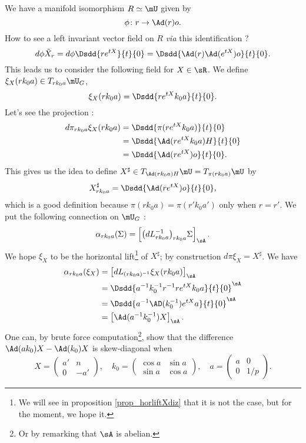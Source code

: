 We have a manifold isomorphism $R\simeq\mU$ given by
\[ 
  \phi\colon r\to \Ad(r)o.
\]
How to see a left invariant vector field on $R$ \emph{via} this identification ? 
\[ 
  d\phi\tilde X_r=d\phi\Dsdd{ r e^{tX} }{t}{0}
        =\Dsdd{ \Ad(r)\Ad( e^{tX})o }{t}{0}.
\]
This leads us to consider the following field for $X\in\sR$. We define $\xi_X(rk_0a)\in T_{rk_0a}\mU_G$,
\begin{equation}
  \xi_X(rk_0a)=\Dsdd{ r e^{tX}k_0a }{t}{0}.
\end{equation}
Let's see the projection :
\[ 
\begin{split}
d\pi_{rk_0a}\xi_X(rk_0a)&=\Dsdd{ \pi(r e^{tX}k_0a) }{t}{0}\\
        &=\Dsdd{ \Ad(r e^{tX}k_0a)H }{t}{0}\\
        &=\Dsdd{ \Ad(r e^{tX})o }{t}{0}.
\end{split} 
\]
This gives us the idea to define $X^{\sharp}\in T_{\Ad(rk_0a)H}\mU=T_{\pi(rk_0a)}\mU$ by
\begin{equation}
X^{\sharp}_{rk_0a}=\Dsdd{ \Ad(re^{tX})o }{t}{0},
\end{equation}
which is a good definition because $\pi(rk_0a)=\pi(r'k_0a')$ only when $r=r'$. We put the following connection on $\mU_G$ :
\begin{equation}
\alpha_{rk_0a}(\Sigma)=\left[     \big( dL_{rk_0a}^{-1} \big)_{rk_0a}\Sigma    \right]_{\sA}.
\end{equation}
We hope $\xi_X$ to be the horizontal lift\footnote{We will see in proposition \ref{prop_horliftXdiz} that it is not the case, but for the moment, we hope it.} of $X^{\sharp}$; by construction $d\pi\xi_X=X^{\sharp}$. We have
\[ 
 \begin{split}
\alpha_{rk_0a}(\xi_X)&=\left[ dL_{(rk_0a)^{-1}}\xi_X(rk_0a) \right]_{\sA}\\
        &=\Dsdd{ a^{-1}k_0^{-1}r^{-1}r e^{tX}k_0a }{t}{0}^{\sA}\\
        &=\Dsdd{ a^{-1}\AD(k_0^{-1}) e^{tX}a}{t}{0}^{\sA}\\
        &=\left[ \Ad(a^{-1}k_0^{-1})X \right]_{\sA}.
\end{split} 
\]
One can, by brute force computation\footnote{Or by remarking that $\sA$ is abelian.}, show that the difference $\Ad(ak_0)X-\Ad(k_0)X$ is skew-diagonal when
\[ 
  X=\begin{pmatrix}
a'&n\\0&-a'
\end{pmatrix},
\quad k_0=\begin{pmatrix}
\cos a&\sin a\\\sin a&\cos a
\end{pmatrix},
\quad
a=\begin{pmatrix}
a&0\\0&1/p
\end{pmatrix}.
\]
